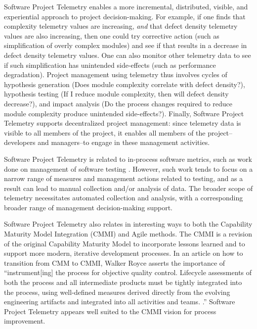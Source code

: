 \documentclass[11pt,twocolumn]{article}
\begin{document}
Software Project Telemetry enables a more incremental, distributed,
visible, and experiential approach to project decision-making. For example,
if one finds that complexity telemetry values are increasing, {\em and}
that defect density telemetry values are also increasing, then one could
try corrective action (such as simplification of overly complex modules)
and see if that results in a decrease in defect density telemetry
values. One can also monitor other telemetry data to see if such
simplification has unintended side-effects (such as performance
degradation).  Project management using telemetry thus involves cycles of
hypothesis generation (Does module complexity correlate with defect
density?), hypothesis testing (If I reduce module complexity, then will
defect density decrease?), and impact analysis (Do the process changes
required to reduce module complexity produce unintended side-effects?).
Finally, Software Project Telemetry supports decentralized project
management: since telemetry data is visible to all members of the project,
it enables all members of the project--developers and managers--to engage
in these management activities.

Software Project Telemetry is related to in-process software metrics, such
as work done on management of software testing \cite{Kan01}. However,
such work tends to focus on a narrow range of measures and management
actions related to testing, and as a result can lead to manual collection and/or analysis of data.  The
broader scope of telemetry necessitates automated collection and analysis,
with a corresponding broader range of management decision-making support.

Software Project Telemetry also relates in interesting ways to both the
Capability Maturity Model Integration (CMMI) and Agile methods. The CMMI is
a revision of the original Capability Maturity Model to incorporate lessons
learned and to support more modern, iterative development processes. In an
article on how to transition from CMM to CMMI, Walker Royce asserts the
importance of ``instrument[ing] the process for objective quality
control. Lifecycle assessments of both the process and all intermediate
products must be tightly integrated into the process, using well-defined
measures derived directly from the evolving engineering artifacts and
integrated into all activities and teams. \cite{Royce02}.''  Software
Project Telemetry appears well suited to the CMMI vision for process
improvement.
\end{document}
